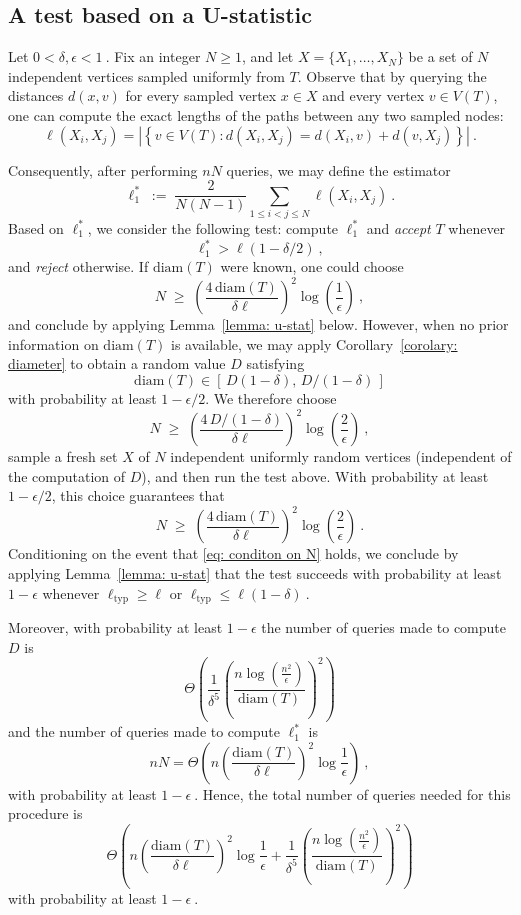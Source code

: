 \documentclass[12pt]{article}
\newcommand{\diam}[1]{\mathrm{diam}\!\left(#1\right)}
\begin{document}
\subsection{A test based on a U-statistic}
\label{sec: typ distance 1}


Let $0<\delta,\epsilon<1~.$ Fix an integer $N \ge 1$, and let $X = \{X_1, \dots, X_N\}$ be a set of $N$ independent vertices sampled uniformly from $T$. 
Observe that by querying the distances $d(x,v)$ for every sampled vertex $x \in X$ and every vertex $v \in V(T)$, one can compute the exact lengths of the paths between any two sampled nodes:
\[
\ell(X_i,X_j)
= \left| \left\{ v\in V(T): d(X_i,X_j)=d(X_i,v)+d(v,X_j)\right\} \right|~.
\]

\noindent Consequently, after performing $nN$ queries, we may define the estimator
\[
\ell_1^* \;:=\; \frac{2}{N(N-1)} \sum_{1\le i<j\le N} \ell (X_i,X_j)~.
\]
Based on $\ell_1^*$, we consider the following test: compute $\ell_1^*$ and \emph{accept} $T$ whenever  
\[
\ell_1^* > \ell(1 - \delta/2)~,
\]
and \emph{reject} otherwise.
If $\diam{T}$ were known, one could choose
\[
N \;\ge\; \left(\frac{4\,\diam{T}}{\delta \ell}\right)^{\!2}
\log\!\left( \frac{1}{\epsilon} \right)~,
\]
and conclude by applying Lemma~\ref{lemma: u-stat} below.  
However, when no prior information on $\diam{T}$ is available, we may apply Corollary~\ref{corolary: diameter} to obtain a random value $D$ satisfying
\[
\diam{T}\in [\,D(1-\delta),\, D/(1-\delta)\,]
\]
with probability at least $1-\epsilon/2$.
We therefore choose
\[
N \;\ge\; 
\left( \frac{4\,D/(1-\delta)}{\delta\ell} \right)^{\!2}
\log\!\left(\frac{2}{\epsilon}\right)~,
\]
sample a fresh set $X$ of $N$ independent uniformly random vertices (independent of the computation of $D$), and then run the test above.  
With probability at least $1-\epsilon/2$, this choice guarantees that
\begin{equation}\label{eq: conditon on N}
    N \;\ge\; \left(\frac{4\,\diam{T}}{\delta\ell}\right)^{\!2}
    \log\!\left(\frac{2}{\epsilon}\right)~.
\end{equation}
Conditioning on the event that \eqref{eq: conditon on N} holds, we conclude by applying Lemma~\ref{lemma: u-stat} that the test succeeds with probability at least $1-\epsilon$ whenever $\ell_{\textrm{typ}} \ge \ell$ or $\ell_{\textrm{typ}} \le \ell(1-\delta)~.$

\medskip
\noindent
Moreover, with probability at least $1-\epsilon$ the number of queries made to compute $D$ is $$\Theta\left(\frac{1}{\delta^5}\left(\frac{n\log(\frac{n^2}{\epsilon})}{\diam{T}}\right)^2\right)$$
and the number of queries made to compute $\ell_1^*$ is 
$$nN=\Theta\left( n\left(\frac{\diam{T}}{\delta\ell}\right)^2\log\!\frac{1}{\epsilon}\right)~,$$
with probability at least $1-\epsilon~.$
Hence, the total number of queries needed for this procedure is
\[
\Theta\left( n\left(\frac{\diam{T}}{\delta\ell}\right)^2\log\!\frac{1}{\epsilon}
+
\frac{1}{\delta^5}\left(\frac{n\log(\frac{n^2}{\epsilon})}{\diam{T}}\right)^2
\right)
\]
with probability at least $1-\epsilon~.$
\end{document}
